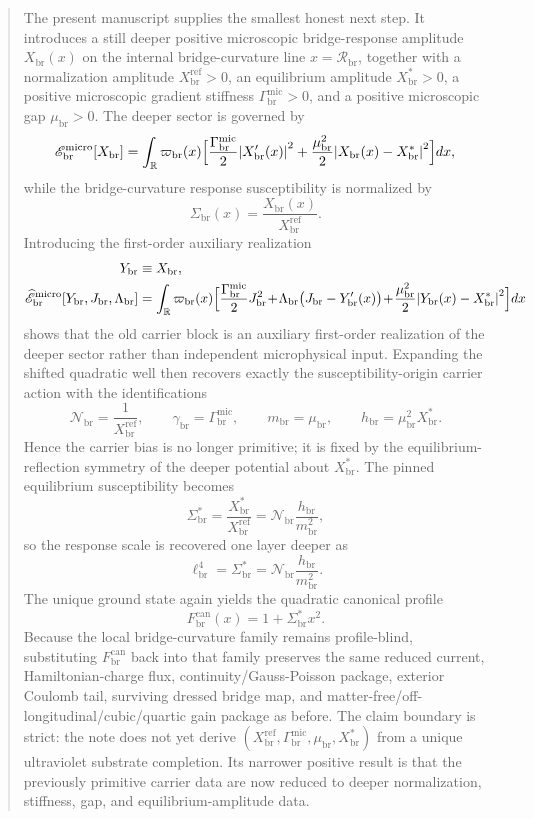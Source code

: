 \documentclass[11pt]{article}
\newcommand{\CurvScale}{\ell_{\mathrm{br}}}
\newcommand{\CurvProfileCan}{F_{\mathrm{br}}^{\mathrm{can}}}
\newcommand{\BridgeCurv}{\mathcal R_{\mathrm{br}}}
\newcommand{\ProfWeight}{\varpi_{\mathrm{br}}}
\newcommand{\RespSus}{\Sigma_{\mathrm{br}}}
\newcommand{\RespSusEq}{\Sigma_{\mathrm{br}}^{\ast}}
\newcommand{\RespCarrier}{Y_{\mathrm{br}}}
\newcommand{\RespFlux}{J_{\mathrm{br}}}
\newcommand{\RespCompat}{\Lambda_{\mathrm{br}}}
\newcommand{\RespNorm}{\mathcal N_{\mathrm{br}}}
\newcommand{\RespFluxCoeff}{\gamma_{\mathrm{br}}}
\newcommand{\RespGap}{m_{\mathrm{br}}}
\newcommand{\RespBias}{h_{\mathrm{br}}}
\newcommand{\RespMicro}{X_{\mathrm{br}}}
\newcommand{\RespMicroEq}{X_{\mathrm{br}}^{\ast}}
\newcommand{\RespMicroRef}{X_{\mathrm{br}}^{\mathrm{ref}}}
\newcommand{\RespMicroFluxCoeff}{\Gamma_{\mathrm{br}}^{\mathrm{mic}}}
\newcommand{\RespMicroGap}{\mu_{\mathrm{br}}}
\newcommand{\RespMicroEnergy}{\mathscr E_{\mathrm{br}}^{\mathrm{micro}}}
\newcommand{\RespMicroAuxEnergy}{\widehat{\mathscr E}_{\mathrm{br}}^{\mathrm{micro}}}
\begin{document}
\begin{abstract}
The present manuscript supplies the smallest honest next step. It introduces a still deeper positive microscopic bridge-response amplitude \(\RespMicro(x)\) on the internal bridge-curvature line \(x=\BridgeCurv\), together with a normalization amplitude \(\RespMicroRef>0\), an equilibrium amplitude \(\RespMicroEq>0\), a positive microscopic gradient stiffness \(\RespMicroFluxCoeff>0\), and a positive microscopic gap \(\RespMicroGap>0\). The deeper sector is governed by
\[
\RespMicroEnergy[\RespMicro]
=
\int_{\mathbb R}\ProfWeight(x)\Bigl[
\frac{\RespMicroFluxCoeff}{2}\abs{\RespMicro'(x)}^2
+
\frac{\RespMicroGap^2}{2}\abs{\RespMicro(x)-\RespMicroEq}^2
\Bigr]dx,
\]
while the bridge-curvature response susceptibility is normalized by
\[
\RespSus(x)=\frac{\RespMicro(x)}{\RespMicroRef}.
\]
Introducing the first-order auxiliary realization
\begin{align*}
\RespCarrier&\equiv\RespMicro,
\\
\RespMicroAuxEnergy[\RespCarrier,\RespFlux,\RespCompat]
&=
\int_{\mathbb R}\ProfWeight(x)\Bigl[
\frac{\RespMicroFluxCoeff}{2}\RespFlux^2
\!+\!
\RespCompat\bigl(\RespFlux-\RespCarrier'(x)\bigr)
\!+\!
\frac{\RespMicroGap^2}{2}\abs{\RespCarrier(x)-\RespMicroEq}^2
\Bigr]dx
\end{align*}
shows that the old carrier block is an auxiliary first-order realization of the deeper sector rather than independent microphysical input. Expanding the shifted quadratic well then recovers exactly the susceptibility-origin carrier action with the identifications
\[
\RespNorm=\frac{1}{\RespMicroRef},
\qquad
\RespFluxCoeff=\RespMicroFluxCoeff,
\qquad
\RespGap=\RespMicroGap,
\qquad
\RespBias=\RespMicroGap^2\RespMicroEq.
\]
Hence the carrier bias is no longer primitive; it is fixed by the equilibrium-reflection symmetry of the deeper potential about \(\RespMicroEq\). The pinned equilibrium susceptibility becomes
\[
\RespSusEq=\frac{\RespMicroEq}{\RespMicroRef}
=
\RespNorm\frac{\RespBias}{\RespGap^2},
\]
so the response scale is recovered one layer deeper as
\[
\CurvScale^4=\RespSusEq=\RespNorm\frac{\RespBias}{\RespGap^2}.
\]
The unique ground state again yields the quadratic canonical profile
\[
\CurvProfileCan(x)=1+\RespSusEq x^2.
\]
Because the local bridge-curvature family remains profile-blind, substituting \(\CurvProfileCan\) back into that family preserves the same reduced current, Hamiltonian-charge flux, continuity/Gauss-Poisson package, exterior Coulomb tail, surviving dressed bridge map, and matter-free/off-longitudinal/cubic/quartic gain package as before. The claim boundary is strict: the note does not yet derive \((\RespMicroRef,\RespMicroFluxCoeff,\RespMicroGap,\RespMicroEq)\) from a unique ultraviolet substrate completion. Its narrower positive result is that the previously primitive carrier data are now reduced to deeper normalization, stiffness, gap, and equilibrium-amplitude data.
\end{abstract}
\end{document}

